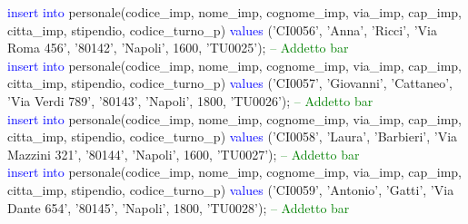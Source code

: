 \documentclass{article}
\begin{document}
\begin{flushleft}
{        \vspace{2mm}
        \hspace*{0.5em}\textcolor{blue}{insert into} personale(codice\_imp, nome\_imp, cognome\_imp, via\_imp, cap\_imp, \hspace*{0.5em}citta\_imp, stipendio, codice\_turno\_p) \textcolor{blue}{values} ('CI0056', 'Anna', 'Ricci', 'Via \hspace*{0.5em}Roma 456', \hspace*{0.5em}'80142', 'Napoli', 1600, 'TU0025'); \hspace*{0.5em} \textcolor{green}{-- Addetto bar} \\
        \vspace{2mm}
        \hspace*{0.5em}\textcolor{blue}{insert into} personale(codice\_imp, nome\_imp, cognome\_imp, via\_imp, cap\_imp, \hspace*{0.5em}citta\_imp, stipendio, codice\_turno\_p) \textcolor{blue}{values} ('CI0057', 'Giovanni', 'Cattaneo', \hspace*{0.5em}'Via Verdi 789', \hspace*{0.5em}'80143', 'Napoli', 1800, 'TU0026'); \hspace*{0.5em} \textcolor{green}{-- Addetto bar} \\
        \vspace{2mm}
        \hspace*{0.5em}\textcolor{blue}{insert into} personale(codice\_imp, nome\_imp, cognome\_imp, via\_imp, cap\_imp, \hspace*{0.5em}citta\_imp, stipendio, codice\_turno\_p) \textcolor{blue}{values} ('CI0058', 'Laura', 'Barbieri', 'Via \hspace*{0.5em}Mazzini 321', \hspace*{0.5em}'80144', 'Napoli', 1600, 'TU0027'); \hspace*{0.5em} \textcolor{green}{-- Addetto bar} \\
        \vspace{2mm}
        \hspace*{0.5em}\textcolor{blue}{insert into} personale(codice\_imp, nome\_imp, cognome\_imp, via\_imp, cap\_imp, \hspace*{0.5em}citta\_imp, stipendio, codice\_turno\_p) \textcolor{blue}{values} ('CI0059', 'Antonio', 'Gatti', 'Via \hspace*{0.5em}Dante 654', \hspace*{0.5em}'80145', 'Napoli', 1800, 'TU0028'); \hspace*{0.5em} \textcolor{green}{-- Addetto bar} \\
}
\end{flushleft}
\end{document}
